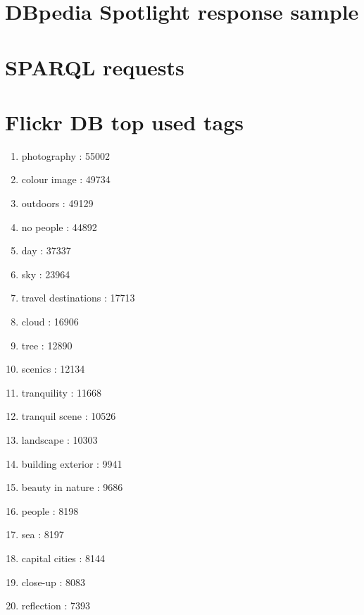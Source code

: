 \newpage

\section{DBpedia Spotlight response sample}
\label{app:spotlight}


\section{SPARQL requests} %
\label{app:sparql_requests}



\newpage

\section{Flickr DB top used tags}
\label{app:statsDB}
\begin{enumerate}
  \item photography : 55002
  \item colour image : 49734
  \item outdoors : 49129
  \item no people : 44892
  \item day : 37337
  \item sky : 23964
  \item travel destinations : 17713
  \item cloud : 16906
  \item tree : 12890
  \item scenics : 12134
  \item tranquility : 11668
  \item tranquil scene : 10526
  \item landscape : 10303
  \item building exterior : 9941
  \item beauty in nature : 9686
  \item people : 8198
  \item sea : 8197
  \item capital cities : 8144
  \item close-up : 8083
  \item reflection : 7393
\end{enumerate}

